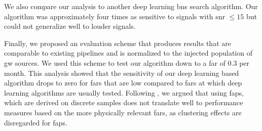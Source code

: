 We also compare our analysis to another deep learning \acrshort{bns} search algorithm. Our algorithm was approximately four times as sensitive to signals with \acrshort{snr} $\leq 15$ but could not generalize well to louder signals.

Finally, we proposed an evaluation scheme that produces results that are comparable to existing pipelines and is normalized to the injected population of \acrshort{gw} sources. We used this scheme to test our algorithm down to a \acrshort{far} of $0.3$ per month. This analysis showed that the sensitivity of our deep learning based algorithm drops to zero for \acrshort{far}s that are low compared to \acrshort{far}s at which deep learning algorithms are usually tested. Following \cite{Gebhard:2019ldz}, we argued that using \acrshort{fap}s, which are derived on discrete samples does not translate well to performance measures based on the more physically relevant \acrshort{far}s, as clustering effects are disregarded for \acrshort{fap}s.
